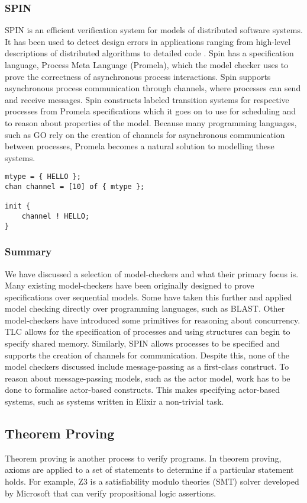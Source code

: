 \subsubsection*{\textbf{SPIN}}
SPIN is an efficient verification system for models of distributed software systems. It has been used to detect design errors in applications ranging from high-level descriptions of distributed algorithms to detailed code \cite{spin}. Spin has a specification language, Process Meta Language (Promela), which the model checker uses to prove the correctness of asynchronous process interactions. Spin supports asynchronous process communication through channels, where processes can send and receive messages. Spin constructs labeled transition systems for respective processes from Promela specifications which it goes on to use for scheduling and to reason about properties of the model. Because many programming languages, such as GO \cite{go} rely on the creation of channels for asynchronous communication between processes, Promela becomes a natural solution to modelling these systems.
\begin{lstlisting}[caption={Example of a Promela specification that enqueues a message in a channel}]
mtype = { HELLO };
chan channel = [10] of { mtype };

init {
    channel ! HELLO;
}
\end{lstlisting}

\subsubsection{Summary}
We have discussed a selection of model-checkers and what their primary focus is. Many existing model-checkers have been originally designed to prove specifications over sequential models. Some have taken this further and applied model checking directly over programming languages, such as BLAST. Other model-checkers have introduced some primitives for reasoning about concurrency. TLC allows for the specification of processes and using structures can begin to specify shared memory. Similarly, SPIN allows processes to be specified and supports the creation of channels for communication. Despite this, none of the model checkers discussed include message-passing as a first-class construct. To reason about message-passing models, such as the actor model, work has to be done to formalise actor-based constructs. This makes specifying actor-based systems, such as systems written in Elixir a non-trivial task.
\subsection{Theorem Proving}
Theorem proving is another process to verify programs. In theorem proving, axioms are applied to a set of statements to determine if a particular statement holds. For example, Z3 \cite{z3} is a satisfiability modulo theories (SMT) solver developed by Microsoft that can verify propositional logic assertions.
